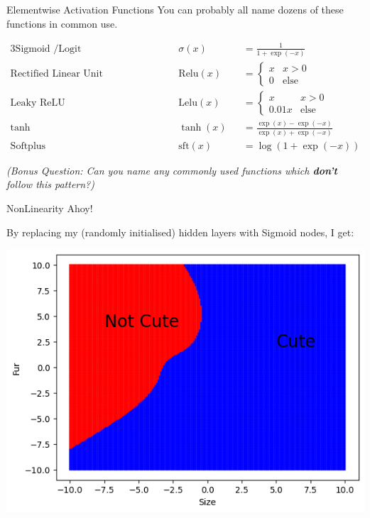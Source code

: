 \documentclass[]{SangerLibrary/sanger-present}
\begin{document}
	\begin{frame}{Elementwise Activation Functions}
		You can probably all name dozens of these functions in common use. 

		\begin{alignat*}{3}
			\text{Sigmoid /Logit}& \hspace{1cm} && \sigma(x) &&  = \frac{1}{1 + \exp(-x)} 
			\\
			\text{Rectified Linear Unit (ReLU)  } & &&\text{Relu}(x) && = \begin{cases} x & x > 0 \\ 0 &\text{else} \end{cases}
			\\
			\text{Leaky ReLU  } & && \text{Lelu}(x) && = \begin{cases} x & x > 0 \\ 0.01x &\text{else} \end{cases} 
			\\
			\text{tanh} & && \tanh(x) && = \frac{\exp(x) - \exp(-x)}{\exp(x) + \exp(-x)}
			\\
			\text{Softplus} & && \text{sft}(x) && = \log\left( 1+ \exp(-x) \right)
		\end{alignat*}

		\textit{(Bonus Question: Can you name any commonly used functions which \textbf{don't} follow this pattern?)}
	\end{frame}


	\begin{frame}{NonLinearity Ahoy!}
	
		By replacing my (randomly initialised) hidden layers with Sigmoid nodes, I get:

		\includegraphics[width=\linewidth,height=0.8\paperheight,keepaspectratio=true]{NonLinearMLP.png}
	\end{frame}
\end{document}
